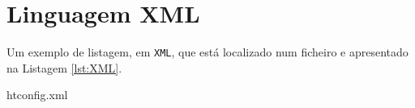\chapter{Linguagem XML}
\label{ch:LangXML}

Um exemplo de listagem, em \texttt{XML}, que está localizado num ficheiro e apresentado na Listagem \ref{lst:XML}.


{htconfig.xml}
